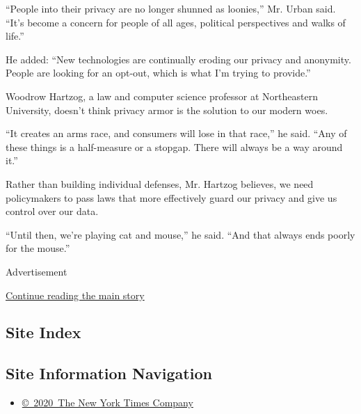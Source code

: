 ``People into their privacy are no longer shunned as loonies,'' Mr.
Urban said. ``It's become a concern for people of all ages, political
perspectives and walks of life.''

He added: ``New technologies are continually eroding our privacy and
anonymity. People are looking for an opt-out, which is what I'm trying
to provide.''

Woodrow Hartzog, a law and computer science professor at Northeastern
University, doesn't think privacy armor is the solution to our modern
woes.

``It creates an arms race, and consumers will lose in that race,'' he
said. ``Any of these things is a half-measure or a stopgap. There will
always be a way around it.''

Rather than building individual defenses, Mr. Hartzog believes, we need
policymakers to pass laws that more effectively guard our privacy and
give us control over our data.

``Until then, we're playing cat and mouse,'' he said. ``And that always
ends poorly for the mouse.''

Advertisement

\protect\hyperlink{after-bottom}{Continue reading the main story}

\hypertarget{site-index}{%
\subsection{Site Index}\label{site-index}}

\hypertarget{site-information-navigation}{%
\subsection{Site Information
Navigation}\label{site-information-navigation}}

\begin{itemize}
\tightlist
\item
  \href{https://help.nytimes.com/hc/en-us/articles/115014792127-Copyright-notice}{©~2020~The
  New York Times Company}
\end{itemize}


